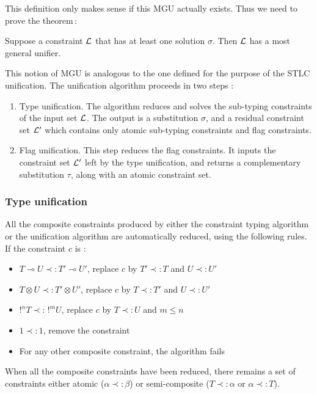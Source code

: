 This definition only makes sense if this MGU actually exists. Thus we need to prove the theorem\,:
\begin{thm}
	\label{existence-MGU}
	Suppose a constraint $\mathcal{L}$ that has at least one solution $\sigma$. Then $\mathcal{L}$ has a most general unifier.
\end{thm}

This notion of MGU is analogous to the one defined for the purpose of the STLC unification.
The unification algorithm proceeds in two steps :
	\begin{enumerate}
		\item Type unification. The algorithm reduces and solves the sub-typing constraints of the input set $\mathcal{L}$.
			The output is a substitution $\sigma$, and a residual constraint set $\mathcal{L}'$ which contains only atomic sub-typing constraints and
			flag constraints.
			
		\item Flag unification. This step reduces the flag constraints. It inputs the constraint set $\mathcal{L}'$ left by the type unification,
			and returns a complementary substitution $\tau$, along with an atomic constraint set.
	\end{enumerate}

\subsubsection{Type unification}

\begin{defn}
	All the composite constraints produced by either the constraint typing
  algorithm or the unification algorithm are automatically reduced, using the following rules.
  If the constraint $c$ is :
  	\begin{itemize}
      \item $T \multimap U \prec: T' \multimap U'$, replace $c$ by $T' \prec: T$ and $U \prec: U'$
      \item $T \otimes U \prec: T' \otimes U'$, replace $c$ by $T \prec: T'$ and $U \prec: U'$
      \item $!^n T \prec: \, !^m U$, replace $c$ by $T \prec: U$ and $m \le n$
      \item $1 \prec: 1$, remove the constraint
      \item For any other composite constraint, the algorithm fails
    \end{itemize}
  When all the composite constraints have been reduced, there remains a set of constraints either atomic ($\alpha \prec: \beta$) or
  semi-composite ($T \prec: \alpha$ or $\alpha \prec: T$).
\end{defn}

